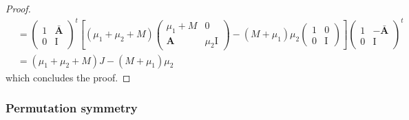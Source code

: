 \documentclass[11pt]{article}
\numberwithin{equation}{section}
\newcommand{\OA}{\mathbf{A}}
\newcommand{\OAD}{\mathbf{\bar{A}}}
\newcommand{\ID}{\mathrm{I}}
\begin{document}
\begin{proof}
\begin{equation}
\begin{split}
        &=\left(\begin{array}{cc}
			1&\OAD\\
			0&\ID
		\end{array}\right)^t\left[(\mu_1+\mu_2+M)\left(\begin{array}{cc}
			\mu_1+M&0\\
			\OA&\mu_2\ID
		\end{array}\right)-(M+\mu_1)\mu_2\left(\begin{array}{cc}
			1&0\\
			0&\ID
		\end{array}\right)\right]\left(\begin{array}{cc}
			1&-\OAD\\
			0&\ID
		\end{array}\right)^t\\
        &=(\mu_1+\mu_2+M)J-(M+\mu_1)\mu_2
        \end{split}
	\end{equation}
	which concludes the proof.
\end{proof}


  \subsubsection{Permutation symmetry} \label{sec:persym}
\end{document}
